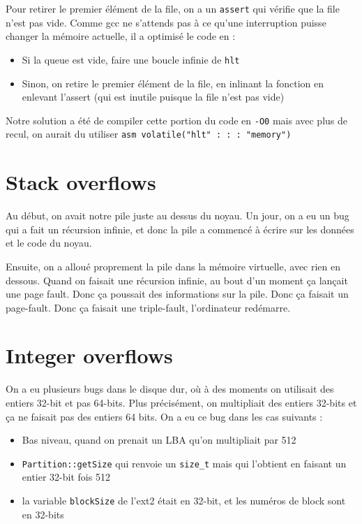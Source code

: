 \documentclass[12pt]{report}
\begin{document}
Pour retirer le premier élément de la file, on a un \verb$assert$ qui vérifie que la file n'est pas vide.
Comme gcc ne s'attends pas à ce qu'une interruption puisse changer la mémoire actuelle, il a optimisé le code en :
\begin{itemize}
    \item Si la queue est vide, faire une boucle infinie de \verb$hlt$
    \item Sinon, on retire le premier élément de la file, en inlinant la fonction en enlevant l'assert (qui est inutile puisque la file n'est pas vide)
\end{itemize}
Notre solution a été de compiler cette portion du code en \verb$-O0$ mais avec plus de recul, on aurait du utiliser \verb$asm volatile("hlt" : : : "memory")$

\section*{Stack overflows}

Au début, on avait notre pile juste au dessus du noyau. Un jour, on a eu un bug qui a fait un récursion infinie, et donc la pile a commencé à écrire sur les données et le code du noyau.

Ensuite, on a alloué proprement la pile dans la mémoire virtuelle, avec rien en dessous. Quand on faisait une récursion infinie, au bout d'un moment ça lançait une page fault. Donc ça poussait des informations sur la pile. Donc ça faisait un page-fault. Donc ça faisait une triple-fault, l'ordinateur redémarre.

\section*{Integer overflows}

On a eu plusieurs bugs dans le disque dur, où à des moments on utilisait des entiers 32-bit et pas 64-bits.
Plus précisément, on multipliait des entiers 32-bits et ça ne faisait pas des entiers 64 bits.
On a eu ce bug dans les cas suivants :

\begin{itemize}
    \item Bas niveau, quand on prenait un LBA qu'on multipliait par 512
    \item \verb$Partition::getSize$ qui renvoie un \verb$size_t$ mais qui l'obtient en faisant un entier 32-bit fois 512
    \item la variable \verb$blockSize$ de l'ext2 était en 32-bit, et les numéros de block sont en 32-bits
\end{itemize}
\end{document}
